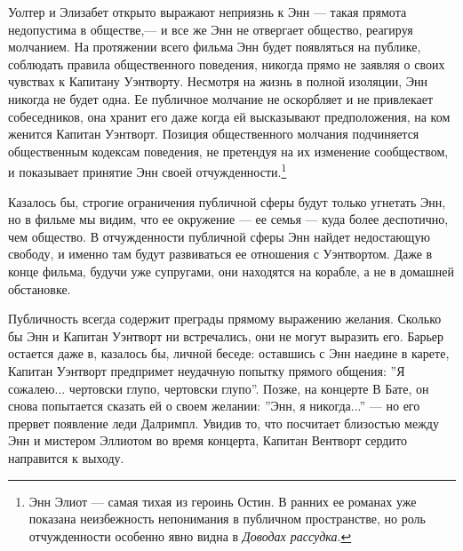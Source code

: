 \documentclass[12pt]{book}
\begin{document}
Уолтер и Элизабет открыто выражают неприязнь к Энн --- такая прямота недопустима в обществе,--- и все же Энн не отвергает общество, реагируя молчанием. На протяжении всего фильма Энн будет появляться на публике, соблюдать правила общественного поведения, никогда прямо не заявляя о своих чувствах к Капитану Уэнтворту. Несмотря на жизнь в полной изоляции, Энн никогда не будет одна. Ее публичное молчание не оскорбляет и не привлекает собеседников, она хранит его даже когда ей высказывают предположения, на ком женится Капитан Уэнтворт. Позиция общественного молчания подчиняется общественным кодексам поведения, не претендуя на их изменение сообществом, и показывает принятие Энн своей отчужденности.\footnote{Энн Элиот --- самая тихая из героинь Остин. В ранних ее романах уже показана неизбежность непонимания в публичном пространстве, но роль отчужденности особенно явно видна в \textit{Доводах рассудка}.}

Казалось бы, строгие ограничения публичной сферы будут только угнетать Энн, но в фильме мы видим, что ее окружение --- ее семья --- куда более деспотично, чем общество. В отчужденности публичной сферы Энн найдет недостающую свободу, и именно там будут развиваться ее отношения с Уэнтвортом. Даже в конце фильма, будучи уже супругами, они находятся на корабле, а не в домашней обстановке.

Публичность всегда содержит преграды прямому выражению желания. Сколько бы Энн и Капитан Уэнтворт ни встречались, они не могут выразить его. Барьер остается даже в, казалось бы, личной беседе: оставшись с Энн наедине в карете, Капитан Уэнтворт предпримет неудачную попытку прямого общения: ''Я сожалею... чертовски глупо, чертовски глупо''. Позже, на концерте В Бате, он снова попытается сказать ей о своем желании: ''Энн, я никогда...'' --- но его прервет появление леди Далримпл. Увидив то, что посчитает близостью между Энн и мистером Эллиотом во время концерта, Капитан Вентворт сердито направится к выходу.
\end{document}
